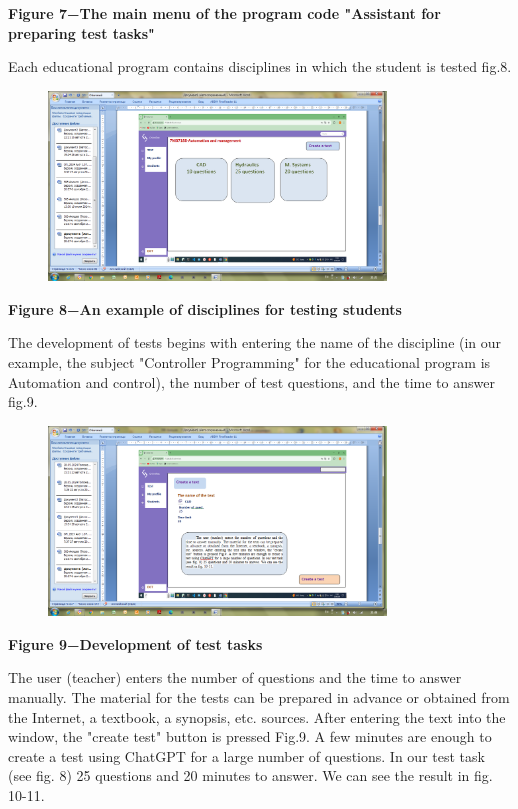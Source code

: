 {\bfseries Figure 7−The main menu of the program code "Assistant for
preparing test tasks"}

Each educational program contains disciplines in which the student is
tested fig.8.

\begin{figure}[H]
	\centering
	\includegraphics[width=0.8\textwidth]{assets/52}
	\caption*{}
\end{figure}

{\bfseries Figure 8−An example of disciplines for testing students}

The development of tests begins with entering the name of the discipline
(in our example, the subject "Controller Programming" for the
educational program is Automation and control), the number of test
questions, and the time to answer fig.9.

\begin{figure}[H]
	\centering
	\includegraphics[width=0.8\textwidth]{assets/53}
	\caption*{}
\end{figure}

{\bfseries Figure 9−Development of test tasks}

The user (teacher) enters the number of questions and the time to answer
manually. The material for the tests can be prepared in advance or
obtained from the Internet, a textbook, a synopsis, etc. sources. After
entering the text into the window, the "create test" button is pressed
Fig.9. A few minutes are enough to create a test using ChatGPT for a
large number of questions. In our test task (see fig. 8) 25 questions
and 20 minutes to answer. We can see the result in fig. 10-11.

